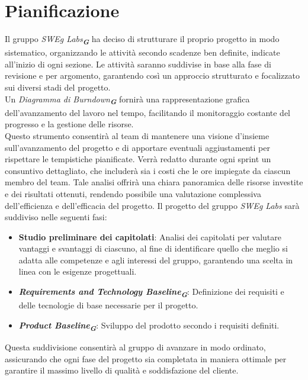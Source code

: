 
\section{Pianificazione}
\label{sec:pianificazione}
Il gruppo \emph{SWEg Labs}\textsubscript{\textit{\textbf{G}}} ha deciso di strutturare il proprio progetto in modo sistematico, 
organizzando le attività secondo scadenze ben definite, indicate all'inizio di ogni sezione. Le attività saranno suddivise in base alla fase di revisione e per argomento, garantendo così un approccio strutturato e focalizzato sui diversi stadi del progetto.\\
Un \emph{Diagramma di Burndown}\textsubscript{\textit{\textbf{G}}} fornirà una rappresentazione grafica dell'avanzamento del lavoro nel tempo, facilitando il monitoraggio costante del progresso e la gestione delle risorse.\\
Questo strumento consentirà al team di mantenere una visione d'insieme sull’avanzamento del progetto e di apportare eventuali aggiustamenti per rispettare le tempistiche pianificate.
Verrà redatto durante ogni sprint un consuntivo dettagliato, che includerà sia i costi che le ore impiegate da ciascun membro del team. Tale analisi offrirà una chiara panoramica delle risorse investite e dei risultati ottenuti, rendendo possibile una valutazione complessiva dell’efficienza e dell’efficacia del progetto.
Il progetto del gruppo \emph{SWEg Labs} sarà suddiviso nelle seguenti fasi:
\begin{itemize}
    \item \textbf{Studio preliminare dei capitolati}: Analisi dei capitolati per valutare vantaggi e svantaggi di ciascuno, al fine di identificare quello che meglio si adatta alle competenze e agli interessi del gruppo, garantendo una scelta in linea con le esigenze progettuali.
    \item \textbf{\emph{Requirements and Technology Baseline}}\textsubscript{\textit{\textbf{G}}}: Definizione dei requisiti e delle tecnologie di base necessarie per il progetto.
    \item \textbf{\emph{Product Baseline}}\textsubscript{\textit{\textbf{G}}}: Sviluppo del prodotto secondo i requisiti definiti.
\end{itemize}

Questa suddivisione consentirà al gruppo di avanzare in modo ordinato, 
assicurando che ogni fase del progetto sia completata in maniera ottimale per garantire il massimo livello di qualità e soddisfazione del cliente.

